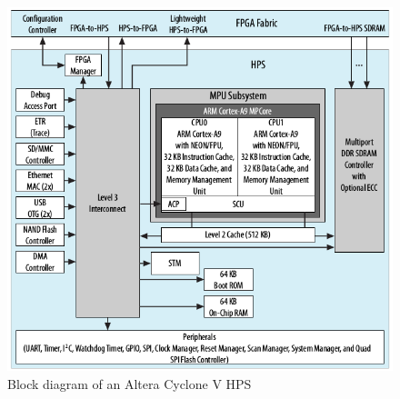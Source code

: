 \begin{figure}[htbp]
\begin{center}
\includegraphics[width=15cm,keepaspectratio=true]{bilder/png/AlteraHPSneu}
\caption{Block diagram of an Altera Cyclone V HPS\cite{altcycvov15}}
\label{fig:alterahpsblocks}
\end{center}
\end{figure}
